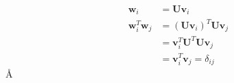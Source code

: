 

\begin{align}
	\textbf{w}_i &= \textbf{Uv}_i\\
	\textbf{w}_i^T\textbf{w}_j &= ( \textbf{Uv}_i)^T \textbf{Uv}_j\\
	&= \textbf{v}_i^T\textbf{U}^T\textbf{Uv}_j\\
	&= \textbf{v}_i^T\textbf{v}_j = \delta_{ij}
\end{align}
\AA
